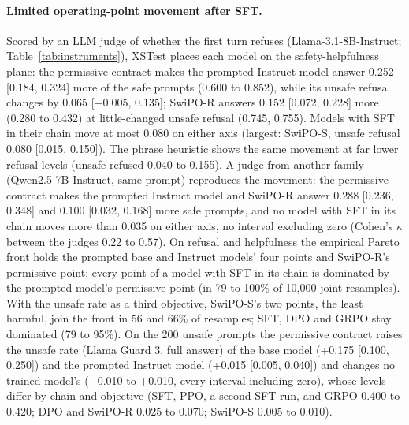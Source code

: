 \paragraph{Limited operating-point movement after SFT.} Scored by an LLM judge of whether the first turn refuses (Llama-3.1-8B-Instruct; Table~\ref{tab:instruments}), XSTest places each model on the safety-helpfulness plane: the permissive contract makes the prompted Instruct model answer 0.252 [0.184, 0.324] more of the safe prompts (0.600 to 0.852), while its unsafe refusal changes by 0.065 [$-$0.005, 0.135]; \mbox{SwiPO-R} answers 0.152 [0.072, 0.228] more (0.280 to 0.432) at little-changed unsafe refusal (0.745, 0.755). Models with SFT in their chain move at most 0.080 on either axis (largest: \mbox{SwiPO-S}, unsafe refusal 0.080 [0.015, 0.150]). The phrase heuristic shows the same movement at far lower refusal levels (unsafe refused 0.040 to 0.155). A judge from another family (Qwen2.5-7B-Instruct, same prompt) reproduces the movement: the permissive contract makes the prompted Instruct model and \mbox{SwiPO-R} answer 0.288 [0.236, 0.348] and 0.100 [0.032, 0.168] more safe prompts, and no model with SFT in its chain moves more than 0.035 on either axis, no interval excluding zero (Cohen's $\kappa$ between the judges 0.22 to 0.57). On refusal and helpfulness the empirical Pareto front holds the prompted base and Instruct models' four points and \mbox{SwiPO-R}'s permissive point; every point of a model with SFT in its chain is dominated by the prompted model's permissive point (in 79 to 100\% of 10,000 joint resamples). With the unsafe rate as a third objective, \mbox{SwiPO-S}'s two points, the least harmful, join the front in 56 and 66\% of resamples; SFT, DPO and GRPO stay dominated (79 to 95\%). On the 200 unsafe prompts the permissive contract raises the unsafe rate (Llama Guard 3, full answer) of the base model (+0.175 [0.100, 0.250]) and the prompted Instruct model (+0.015 [0.005, 0.040]) and changes no trained model's ($-$0.010 to +0.010, every interval including zero), whose levels differ by chain and objective (SFT, PPO, a second SFT run, and GRPO 0.400 to 0.420; DPO and \mbox{SwiPO-R} 0.025 to 0.070; \mbox{SwiPO-S} 0.005 to 0.010).

